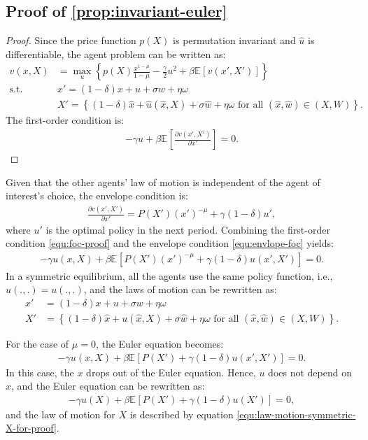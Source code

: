 \documentclass[12pt]{article}
\newcommand{\expec}[2][]{\ensuremath{\mathbb{E}_{{#1}}\left[ {#2} \right]}}
\begin{document}
\subsection{Proof of \cref{prop:invariant-euler}}\label{sec:proof-permutation-invariant-equilibrium}
\begin{proof}
Since the price function $p(X)$ is permutation invariant and $\hat{u}$ is differentiable, the agent problem can be written as:
\begin{align}
v(x,X) &=\max_{u}\left\{p(X)\frac{x^{1-\mu}}{1-\mu} -  \frac{\gamma}{2} u^2 + \beta \expec{v(x',X')}\right\}\\
\text{s.t. } & x' = (1-\delta)x + u + \sigma w + \eta \omega\\
& X' = \left\{(1-\delta)\hat{x} + \hat{u}(\hat{x},X) + \sigma \hat{w} + \eta \omega \text{ for all } (\hat{x},\hat{w}) \in (X,W)\right\}.\label{equ:law-motion-X-for-proof}
\end{align}
The first-order condition is:
\begin{align}
\label{equ:foc-proof}
-\gamma u + \beta \expec{\frac{\partial v(x',X')}{\partial x'}} = 0.
\end{align}
\end{proof}
Given that the other agents' law of motion is independent of the agent of interest's choice, the envelope condition is:
\begin{align}
\label{equ:envlope-foc}
\frac{\partial v(x',X')}{\partial x'} = P(X')(x')^{-\mu}+\gamma(1-\delta) u',
\end{align} 
where $u'$ is the optimal policy in the next period. Combining the first-order condition \cref{equ:foc-proof} and the envelope condition \cref{equ:envlope-foc} yields:
\begin{align}
-\gamma u(x,X)+ \beta \expec{ P(X')(x')^{-\mu}+\gamma (1-\delta) u(x',X') } = 0.
\end{align}
In a symmetric equilibrium, all the agents use the same policy function, i.e., $\hat{u}(.,.) = u(.,.)$, and the laws of motion can be rewritten as: 
\begin{align}
x'& = (1-\delta)x + u + \sigma w + \eta \omega\\
X'& = \left\{(1-\delta)\hat{x} + u(\hat{x},X) + \sigma \hat{w} + \eta \omega \text{ for all } (\hat{x},\hat{w}) \in (X,W)\right\}. \label{equ:law-motion-symmetric-X-for-proof}
\end{align}

For the case of $\mu = 0$, the Euler equation becomes:
\begin{align}
-\gamma u(x,X)+ \beta \expec{ P(X')+\gamma (1-\delta) u(x',X') } = 0.
\end{align}
In this case, the $x$ drops out of the Euler equation. Hence, $u$ does not depend on $x$, and the Euler equation can be rewritten as:
\begin{align}
- \gamma u(X)+ \beta \expec{ P(X')+\gamma (1-\delta) u(X') } = 0,
\end{align} 
and the law of motion for $X$ is described by equation \cref{equ:law-motion-symmetric-X-for-proof}.
\end{document}
